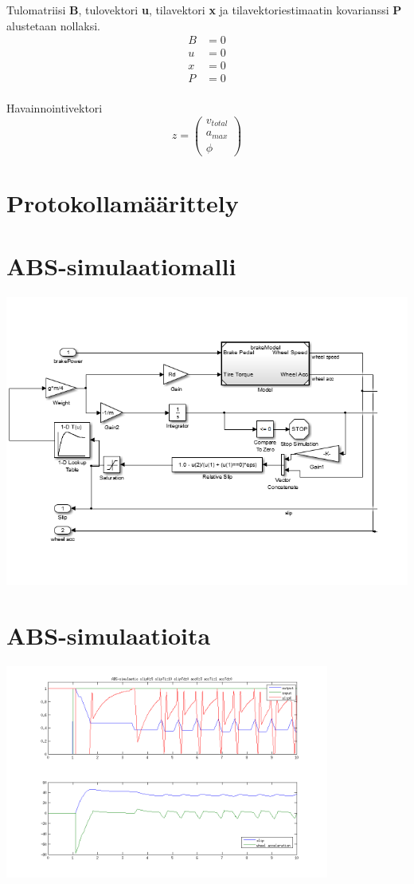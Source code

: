 \documentclass{article}
\newcommand{\kuvaa}[4]{%
	\begin{figure}[h]%
		\centering \texttt{[image: \#2]}%
		\caption{#3 \label{fig:#4}}%
	\end{figure}%
}
\begin{document}
\begin{appendices}
Tulomatriisi \textbf{B}, tulovektori \textbf{u}, tilavektori \textbf{x} ja tilavektoriestimaatin kovarianssi \textbf{P} alustetaan nollaksi.
\begin{align*}
B &= 0\\
u &= 0\\
x &= 0\\
P &= 0\\
\end{align*}

Havainnointivektori
\[
z =
\begin{pmatrix}
v_{total} \\
a_{max} \\
\phi
\end{pmatrix}
\]

\clearpage
\section{Protokollamäärittely}

\clearpage

\section{ABS-simulaatiomalli} \label{app:simmodel}
{\centering \includegraphics[width=1.0\textwidth]{qrtVehMdl}}

\section{ABS-simulaatioita} \label{app:abssim}
{\centering \includegraphics[width=0.8\textwidth]{abssim1}

}
\end{appendices}
\end{document}
